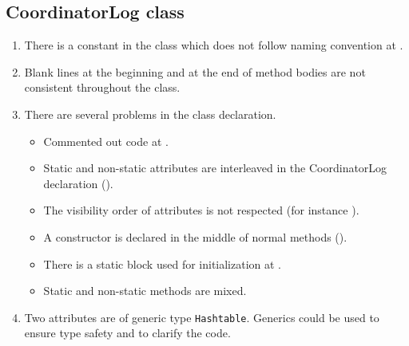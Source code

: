 \subsection{CoordinatorLog class}
\label{sec:coordinatorlog-class}
\begin{enumerate}
	\item {} There is a constant in the class which does not follow naming convention at .
    \item {} Blank lines at the beginning and at the end of method bodies are not consistent throughout the class.
    \item {} There are several problems in the class declaration.
    \begin{itemize}
        \item  Commented out code at .
        \item Static and non-static attributes are interleaved in the CoordinatorLog declaration ().
        \item The visibility order of attributes is not respected (for instance ).
        \item A constructor is declared in the middle of normal methods ().
        \item There is a static block used for initialization at .
        \item Static and non-static methods are mixed.
    \end{itemize}
    \item {} Two attributes are of generic type \texttt{Hashtable}. Generics could be used to ensure type safety and to clarify the code.


\end{enumerate}
